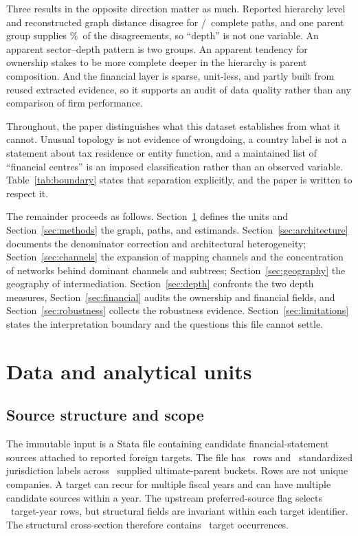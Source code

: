 \documentclass[11pt]{article}
\newcommand{\pct}{\%}
\begin{document}
Three results in the opposite direction matter as much. Reported hierarchy
level and reconstructed graph distance disagree for
\DepthMismatchCount/\CompletePaths\ complete paths, and one parent group
supplies \MothersonMismatchShare\pct\ of the disagreements, so ``depth'' is not
one variable. An apparent sector--depth pattern is two groups. An apparent
tendency for ownership stakes to be more complete deeper in the hierarchy is
parent composition. And the financial layer is sparse, unit-less, and partly
built from reused extracted evidence, so it supports an audit of data quality
rather than any comparison of firm performance.

Throughout, the paper distinguishes what this dataset establishes from what it
cannot. Unusual topology is not evidence of wrongdoing, a country label is not
a statement about tax residence or entity function, and a maintained list of
``financial centres'' is an imposed classification rather than an observed
variable. Table~\ref{tab:boundary} states that separation explicitly, and the
paper is written to respect it.

The remainder proceeds as follows. Section~\ref{sec:data} defines the units and
Section~\ref{sec:methods} the graph, paths, and estimands.
Section~\ref{sec:architecture} documents the denominator correction and
architectural heterogeneity; Section~\ref{sec:channels} the expansion of
mapping channels and the concentration of networks behind dominant channels and
subtrees; Section~\ref{sec:geography} the geography of intermediation.
Section~\ref{sec:depth} confronts the two depth measures,
Section~\ref{sec:financial} audits the ownership and financial fields, and
Section~\ref{sec:robustness} collects the robustness evidence.
Section~\ref{sec:limitations} states the interpretation boundary and the
questions this file cannot settle.

\section{Data and analytical units}
\label{sec:data}

\subsection{Source structure and scope}

The immutable input is a Stata file containing candidate financial-statement
sources attached to reported foreign targets. The file has \RawRows\ rows and
\Jurisdictions\ standardized jurisdiction labels across \Parents\ supplied
ultimate-parent buckets. Rows are not unique companies. A target can recur for
multiple fiscal years and can have multiple candidate sources within a year.
The upstream preferred-source flag selects \PreferredRows\ target-year rows,
but structural fields are invariant within each target identifier. The
structural cross-section therefore contains \Targets\ target occurrences.
\end{document}
